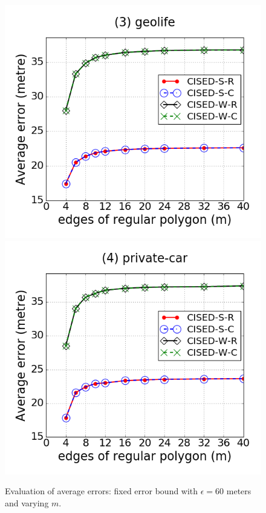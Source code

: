 \begin{figure}[tb!]
\includegraphics[scale = 0.250]{figures/Exp-M-e-60-error-geolife.png}
\includegraphics[scale = 0.250]{figures/Exp-M-e-60-error-private.png}
\vspace{-2ex}
\caption{\small Evaluation of average errors: fixed error bound with $\epsilon = 60$ meters and varying $m$.}
\label{fig:m-error-e60}
\vspace{-2ex}
\end{figure}


